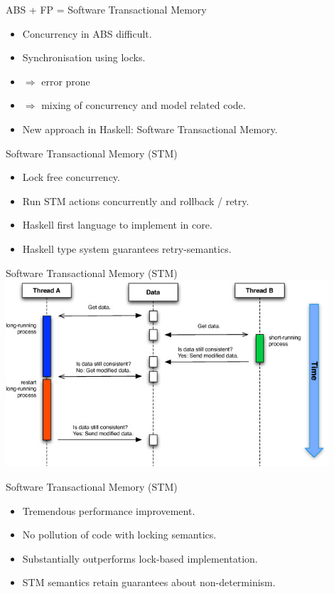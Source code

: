 \documentclass{beamer} %
\begin{document}
\begin{frame}{ABS + FP = Software Transactional Memory}
  \begin{itemize}
  	\item Concurrency in ABS difficult.
	\item Synchronisation using locks.
  	\item $\Rightarrow$ error prone 
  	\item $\Rightarrow$ mixing of concurrency and model related code.
  	\item New approach in Haskell: Software Transactional Memory.
  \end{itemize}
\end{frame}

\begin{frame}{Software Transactional Memory (STM)}
  \begin{itemize}   	
  	\item Lock free concurrency.
  	\item Run STM actions concurrently and rollback / retry.
  	\item Haskell first language to implement in core.    
    \item Haskell type system guarantees retry-semantics.
  \end{itemize}
\end{frame}

\begin{frame}{Software Transactional Memory (STM)}
  \includegraphics[width=0.9\textwidth]{./fig/stm.png}
\end{frame}

\begin{frame}{Software Transactional Memory (STM)}
  \begin{itemize}
  	\item Tremendous performance improvement.
  	\item No pollution of code with locking semantics.
    \item Substantially outperforms lock-based implementation.
    \item STM semantics retain guarantees about non-determinism.
  \end{itemize}
\end{frame}
\end{document}
